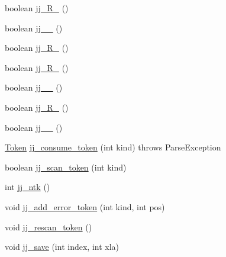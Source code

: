 \begin{DoxyCompactItemize}
boolean \hyperlink{classde_1_1uulm_1_1ecs_1_1ai_1_1owlapi_1_1krssparser_1_1_k_r_s_s2_parser_a5d52c5349ee1e37081ac72069440fc16}{jj\-\_\-R\-\_} ()
\item 
boolean \hyperlink{classde_1_1uulm_1_1ecs_1_1ai_1_1owlapi_1_1krssparser_1_1_k_r_s_s2_parser_a7071e871d981e38e275566e5aef1dc6c}{jj\-\_\-\_} ()
\item 
boolean \hyperlink{classde_1_1uulm_1_1ecs_1_1ai_1_1owlapi_1_1krssparser_1_1_k_r_s_s2_parser_a3f9a67c07b83f0464f3962eba8dadd11}{jj\-\_\-R\-\_} ()
\item 
boolean \hyperlink{classde_1_1uulm_1_1ecs_1_1ai_1_1owlapi_1_1krssparser_1_1_k_r_s_s2_parser_a87d1deecafe57ab2b4c59a925ea816af}{jj\-\_\-R\-\_} ()
\item 
boolean \hyperlink{classde_1_1uulm_1_1ecs_1_1ai_1_1owlapi_1_1krssparser_1_1_k_r_s_s2_parser_aa2145712648598c47cecae35c86a228d}{jj\-\_\-\_} ()
\item 
boolean \hyperlink{classde_1_1uulm_1_1ecs_1_1ai_1_1owlapi_1_1krssparser_1_1_k_r_s_s2_parser_a02c79673085f96503bcf604cf59b55cc}{jj\-\_\-R\-\_} ()
\item 
boolean \hyperlink{classde_1_1uulm_1_1ecs_1_1ai_1_1owlapi_1_1krssparser_1_1_k_r_s_s2_parser_a6674eedfffb5caa129c9449943c05387}{jj\-\_\-\_} ()
\item 
\hyperlink{classde_1_1uulm_1_1ecs_1_1ai_1_1owlapi_1_1krssparser_1_1_token}{Token} \hyperlink{classde_1_1uulm_1_1ecs_1_1ai_1_1owlapi_1_1krssparser_1_1_k_r_s_s2_parser_ac13c9bcecd8ab7119c4f3ceca2e5a1b3}{jj\-\_\-consume\-\_\-token} (int kind)  throws Parse\-Exception 
\item 
boolean \hyperlink{classde_1_1uulm_1_1ecs_1_1ai_1_1owlapi_1_1krssparser_1_1_k_r_s_s2_parser_acfc371a596fea90da188a2e99df4b624}{jj\-\_\-scan\-\_\-token} (int kind)
\item 
int \hyperlink{classde_1_1uulm_1_1ecs_1_1ai_1_1owlapi_1_1krssparser_1_1_k_r_s_s2_parser_a30a16a43870491de92ccfcecdcbdf898}{jj\-\_\-ntk} ()
\item 
void \hyperlink{classde_1_1uulm_1_1ecs_1_1ai_1_1owlapi_1_1krssparser_1_1_k_r_s_s2_parser_a75497fdb95da552e373dfcc5e684778e}{jj\-\_\-add\-\_\-error\-\_\-token} (int kind, int pos)
\item 
void \hyperlink{classde_1_1uulm_1_1ecs_1_1ai_1_1owlapi_1_1krssparser_1_1_k_r_s_s2_parser_a311f135a1624328f77221628a555b5d4}{jj\-\_\-rescan\-\_\-token} ()
\item 
void \hyperlink{classde_1_1uulm_1_1ecs_1_1ai_1_1owlapi_1_1krssparser_1_1_k_r_s_s2_parser_a8a36203a7af7b93fe4467e5288d8f9d2}{jj\-\_\-save} (int index, int xla)
\end{DoxyCompactItemize}
